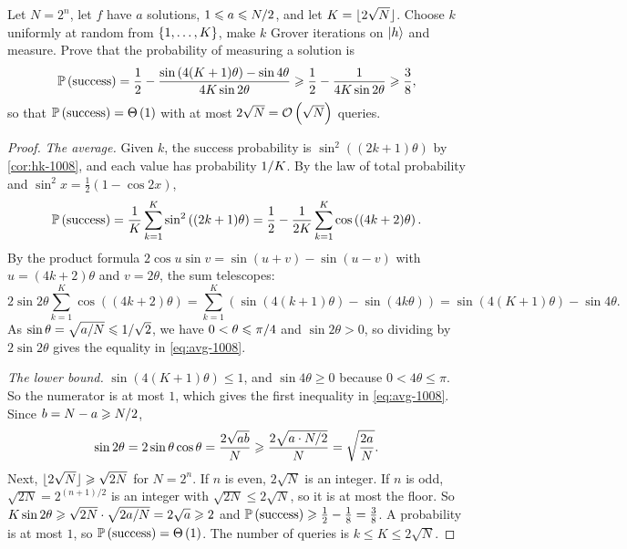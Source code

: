 \begin{exercisebox}
\begin{exercise}\label{ex:randomk-1008}\label{thm:randomk-1008}
    Let $N = 2^n$, let $f$ have $a$ solutions, $1 \leqslant a \leqslant N/2$, and let
    $K = \floor{2\sqrt{N}}$. Choose $k$ uniformly at random from $\left\lbrace1, \dots, K\right\rbrace$, make $k$ Grover
    iterations on $\lvert h \rangle$ and measure. Prove that the probability of measuring a solution is
    \begin{equation}\label{eq:avg-1008}
        \operatorname{\mathbb{P}}\left(\text{success}\right) = \frac{1}{2} - \frac{\sin\left(4(K+1)\theta\right) - \sin 4\theta}{4K\sin 2\theta}
        \geqslant \frac{1}{2} - \frac{1}{4K\sin 2\theta} \geqslant \frac{3}{8},
    \end{equation}
    so that $\operatorname{\mathbb{P}}\left(\text{success}\right) = \Theta\left(1\right)$ with at most $2\sqrt{N} = \mathcal{O}\left(\sqrt{N}\right)$ queries.
\end{exercise}
\tcblower
\begin{proof}
    \emph{The average.} Given $k$, the success probability is $\sin^2((2k+1)\theta)$ by
    \cref{cor:hk-1008}, and each value has probability $1/K$. By the law of total probability
    and $\sin^2 x = \frac{1}{2}(1 - \cos 2x)$,
    \[\operatorname{\mathbb{P}}\left(\text{success}\right) = \frac{1}{K}\sum_{k=1}^{K} \sin^2\left((2k+1)\theta\right)
        = \frac{1}{2} - \frac{1}{2K}\sum_{k=1}^{K} \cos\left((4k+2)\theta\right).\]
    By the product formula $2\cos u \sin v = \sin(u+v) - \sin(u-v)$ with $u = (4k+2)\theta$ and
    $v = 2\theta$, the sum telescopes:
    \[2\sin 2\theta \sum_{k=1}^{K} \cos\left((4k+2)\theta\right)
        = \sum_{k=1}^{K} \left(\sin\left(4(k+1)\theta\right) - \sin\left(4k\theta\right)\right)
        = \sin\left(4(K+1)\theta\right) - \sin 4\theta.\]
    As $\sin\theta = \sqrt{a/N} \leqslant 1/\sqrt{2}$, we have $0 < \theta \leqslant \pi/4$
    and $\sin 2\theta > 0$, so dividing by $2\sin 2\theta$ gives the equality in \cref{eq:avg-1008}.

    \emph{The lower bound.} $\sin(4(K+1)\theta) \leq 1$, and $\sin 4\theta \geq 0$ because
    $0 < 4\theta \leq \pi$. So the numerator is at most $1$, which gives the first inequality in
    \cref{eq:avg-1008}. Since $b = N - a \geqslant N/2$,
    \[\sin 2\theta = 2\sin\theta\cos\theta = \frac{2\sqrt{ab}}{N} \geqslant \frac{2\sqrt{a \cdot N/2}}{N} = \sqrt{\frac{2a}{N}}.\]
    Next, $\floor{2\sqrt{N}} \geq \sqrt{2N}$ for $N = 2^n$. If $n$ is even, $2\sqrt{N}$ is an integer.
    If $n$ is odd, $\sqrt{2N} = 2^{(n+1)/2}$ is an integer with $\sqrt{2N} \leq 2\sqrt{N}$, so it is at
    most the floor. So $K\sin 2\theta \geqslant \sqrt{2N} \cdot \sqrt{2a/N} = 2\sqrt{a} \geqslant 2$
    and $\operatorname{\mathbb{P}}\left(\text{success}\right) \geqslant \frac{1}{2} - \frac{1}{8} = \frac{3}{8}$. A probability is at most
    $1$, so $\operatorname{\mathbb{P}}\left(\text{success}\right) = \Theta\left(1\right)$. The number of queries is $k \leq K \leq 2\sqrt{N}$.
\end{proof}
\end{exercisebox}

